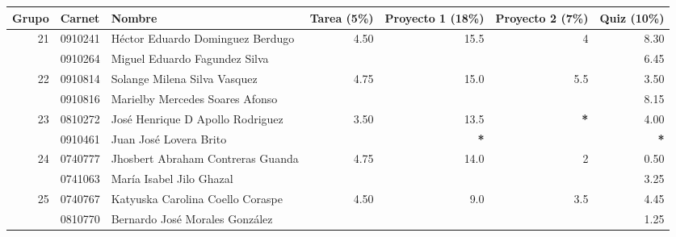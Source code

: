 \documentclass[]{article}
\begin{document}
        \newcommand{\NoE}{\textbf{*}}
        \newcommand{\NoN}{\textbf{—}}

        \begin{tabular}{ | r | l | l | r | r | r | r | }
                \hline
                Grupo & Carnet & Nombre & Tarea (5\%) & Proyecto 1 (18\%) & Proyecto 2 (7\%) & Quiz (10\%) \\

                \hline \multirow{2}{*}{21}
                & 0910241 & Héctor Eduardo Dominguez Berdugo  & \multirow{2}{*}{4.50} & \multirow{2}{*}{15.5} & \multirow{2}{*}{ 4  } & 8.30 \\
                & 0910264 & Miguel Eduardo Fagundez Silva     &                       &                       &                       & 6.45 \\

                \hline \multirow{2}{*}{22}
                & 0910814 & Solange Milena Silva Vasquez      & \multirow{2}{*}{4.75} & \multirow{2}{*}{15.0} & \multirow{2}{*}{ 5.5} & 3.50 \\
                & 0910816 & Marielby Mercedes Soares Afonso   &                       &                       &                       & 8.15 \\

                \hline \multirow{2}{*}{23}
                & 0810272 & José Henrique D Apollo Rodriguez  & \multirow{2}{*}{3.50} & \multirow{1}{*}{13.5} & \multirow{2}{*}{\NoE} & 4.00 \\
                & 0910461 & Juan José Lovera Brito            &                       & \multirow{1}{*}{\NoE} &                       & \NoE \\

                \hline \multirow{2}{*}{24}
                & 0740777 & Jhosbert Abraham Contreras Guanda & \multirow{2}{*}{4.75} & \multirow{2}{*}{14.0} & \multirow{2}{*}{ 2  } & 0.50 \\
                & 0741063 & María Isabel Jilo Ghazal          &                       &                       &                       & 3.25 \\

                \hline \multirow{2}{*}{25}
                & 0740767 & Katyuska Carolina Coello Coraspe  & \multirow{2}{*}{4.50} & \multirow{2}{*}{ 9.0} & \multirow{2}{*}{ 3.5} & 4.45 \\
                & 0810770 & Bernardo José Morales González    &                       &                       &                       & 1.25 \\


\end{tabular}
\end{document}
